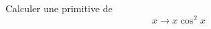 Calculer une primitive de 
\begin{displaymath}
 x \rightarrow x\cos^2 x
\end{displaymath}
\bigskip \bigskip
